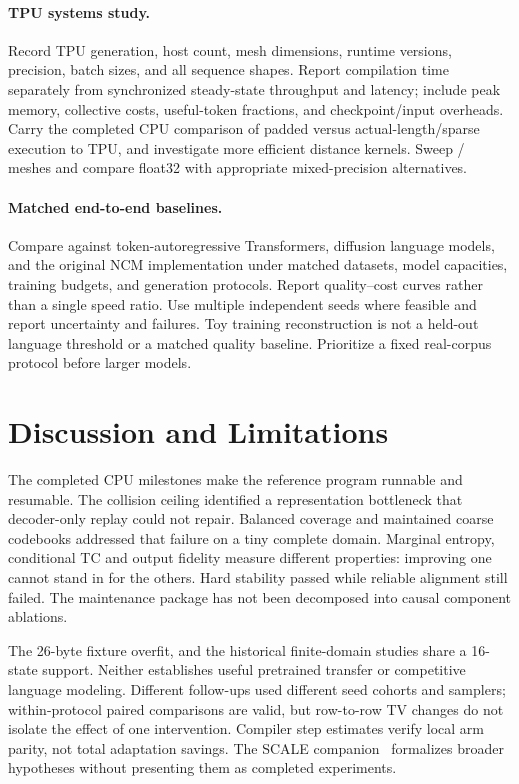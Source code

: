 \documentclass[11pt,a4paper]{article}
\begin{document}
\paragraph{TPU systems study.}
Record TPU generation, host count, mesh dimensions, runtime versions,
precision, batch sizes, and all sequence shapes. Report compilation time
separately from synchronized steady-state throughput and latency; include
peak memory, collective costs, useful-token fractions, and checkpoint/input
overheads. Carry the completed CPU comparison of padded versus actual-length/sparse
execution to TPU, and investigate more efficient distance kernels. Sweep / meshes
and compare float32 with appropriate mixed-precision alternatives.

\paragraph{Matched end-to-end baselines.}
Compare against token-autoregressive Transformers, diffusion language models,
and the original NCM implementation under matched datasets, model capacities,
training budgets, and generation protocols. Report quality--cost curves rather
than a single speed ratio. Use multiple independent seeds where feasible and
report uncertainty and failures. Toy training reconstruction is not a held-out language threshold or a matched
quality baseline. Prioritize a fixed real-corpus protocol before larger models.

\section{Discussion and Limitations}
\label{sec:limitations}
The completed CPU milestones make the reference program runnable and resumable.
The collision ceiling identified a representation bottleneck that decoder-only
replay could not repair. Balanced coverage and maintained coarse codebooks
addressed that failure on a tiny complete domain. Marginal entropy, conditional
TC and output fidelity measure different properties: improving one cannot stand
in for the others. Hard stability passed while reliable alignment still failed.
The maintenance package has not been decomposed into causal component ablations.

The 26-byte fixture overfit, and the historical finite-domain studies share a 16-state
support. Neither establishes useful pretrained transfer or competitive language
modeling. Different follow-ups used different seed cohorts and samplers;
within-protocol paired comparisons are valid, but row-to-row TV changes do not
isolate the effect of one intervention. Compiler step estimates verify local
arm parity, not total adaptation savings. The SCALE companion~\citep{scalecompanion}
formalizes broader hypotheses without presenting them as completed experiments.
\end{document}
